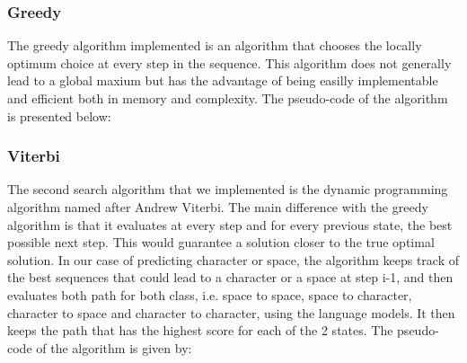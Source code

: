 \documentclass[11pt]{article}
\begin{document}
\subsubsection{Greedy}
The greedy algorithm implemented is an algorithm that chooses the locally optimum choice at every step in the sequence. This algorithm does not generally lead to a global maxium but has the advantage of being easilly implementable and efficient both in memory and complexity. The pseudo-code of the algorithm is presented below:

 \begin{algorithmic}[1]
    \EndFor{}
    \EndProcedure{}
  \end{algorithmic}
\subsubsection{Viterbi}
The second search algorithm that we implemented is the dynamic programming algorithm named after Andrew Viterbi. The main difference with the greedy algorithm is that it evaluates at every step and for every previous state, the best possible next step. This would guarantee a solution closer to the true optimal solution. In our case of predicting character or space, the algorithm keeps track of the best sequences that could lead to a character or a space at step i-1, and then evaluates both path for both class, i.e. space to space, space to character, character to space and character to character, using the language models. It then keeps the path that has the highest score for each of the 2 states. The pseudo-code of the algorithm is given by:\\

\begin{algorithmic}
    \EndIf{}
    \EndFor{}
    \EndFor{}
    \EndFor{}
    \EndProcedure{}
  \end{algorithmic}
  
\end{document}
